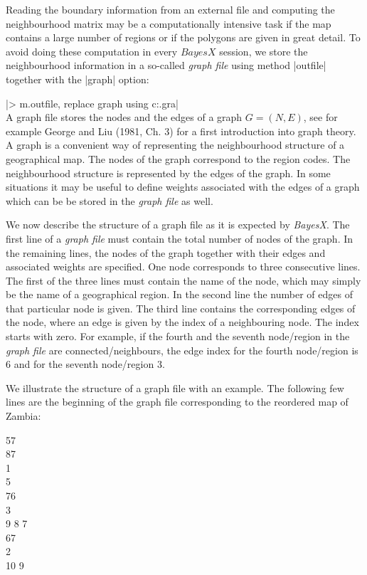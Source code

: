 \documentclass[a4paper]{article}
\begin{document}
Reading the boundary information from an external file and computing the neighbourhood matrix may be a computationally
intensive task if the map contains a large number of regions or if the polygons are given in great detail. To avoid doing these
computation in every $BayesX$ session, we store the neighbourhood information in a so-called {\it graph file} using method
|outfile| together with the |graph| option:

|> m.outfile, replace graph using c:\data\zambiasort.gra|\\

A graph file stores the nodes and the edges of a graph $G =
(N,E)$, see for example George and Liu (1981, Ch. 3) for a first
introduction into graph theory. A graph is a convenient way of
representing the neighbourhood structure of a geographical map.
The nodes of the graph correspond to the region codes. The
neighbourhood structure is represented by the edges of the graph.
In some situations it may be useful to define weights associated
with the edges of a graph which can be be stored in the {\em graph
file} as well.

We now describe the structure of a graph file as it is expected by
{\em BayesX}. The first line of a {\em graph file} must contain
the total number of nodes of the graph. In the remaining lines,
the nodes of the graph together with their edges and associated
weights are specified. One node corresponds to three consecutive
lines. The first of the three lines must contain the name of the
node, which may simply be the name of a geographical region. In
the second line the number of edges of that particular node is
given. The third line contains the corresponding edges of the
node, where an edge is given by the index of a neighbouring node.
The index starts with zero. For example, if the fourth and the
seventh node/region in the {\em graph file} are
connected/neighbours, the edge index for the fourth node/region is
6 and for the seventh node/region 3.

We illustrate the structure of a graph file with an example. The
following few lines are the beginning
of the graph file corresponding to the reordered map of Zambia: \\

\footnotesize

 57\\
 87\\
 1\\
 5\\
 76\\
 3\\
 9 8 7\\
 67\\
 2\\
 10 9\\
\end{document}
